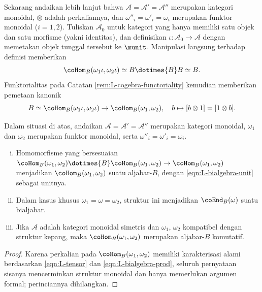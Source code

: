 Sekarang andaikan lebih lanjut bahwa $\mathcal{A} = \mathcal{A}' = \mathcal{A}''$ merupakan kategori monoidal, $\otimes$ adalah perkaliannya, dan $\omega''_i = \omega'_i = \omega_i$ merupakan funktor monoidal ($i=1,2$). Tuliskan $\mathcal{A}_0$ untuk kategori yang hanya memiliki satu objek dan satu morfisme (yakni identitas), dan definisikan $\iota: \mathcal{A}_0 \to \mathcal{A}$ dengan memetakan objek tunggal tersebut ke $\munit$. Manipulasi langsung terhadap definisi memberikan
\[ \coHom_B(\omega_1 \iota, \omega_2 \iota) \simeq B \dotimes{B} B \simeq B. \]
Funktorialitas pada Catatan \ref{rem:L-cogebra-functoriality} kemudian memberikan pemetaan kanonik
\begin{equation}\label{eqn:L-bialgebra-unit}
	B \simeq \coHom_B(\omega_1 \iota, \omega_2 \iota) \to \coHom_B(\omega_1, \omega_2), \quad b \mapsto [b \otimes 1] = [1 \otimes b].
\end{equation}

\begin{proposition}\label{prop:L-bialgebra}
	Dalam situasi di atas, andaikan $\mathcal{A} = \mathcal{A}' = \mathcal{A}''$ merupakan kategori monoidal, $\omega_1$ dan $\omega_2$ merupakan funktor monoidal, serta $\omega''_i = \omega'_i = \omega_i$.
	\begin{enumerate}[(i)]
		\item Homomorfisme yang bersesuaian $\coHom_B(\omega_1, \omega_2) \dotimes{B} \coHom_B(\omega_1, \omega_2) \to \coHom_B(\omega_1, \omega_2)$ menjadikan $\coHom_B(\omega_1, \omega_2)$ suatu aljabar-$B$, dengan \eqref{eqn:L-bialgebra-unit} sebagai unitnya.
		\item Dalam kasus khusus $\omega_1 = \omega = \omega_2$, struktur ini menjadikan $\coEnd_B(\omega)$ suatu bialjabar.
		\item Jika $\mathcal{A}$ adalah kategori monoidal simetris dan $\omega_1$, $\omega_2$ kompatibel dengan struktur kepang, maka $\coHom_B(\omega_1, \omega_2)$ merupakan aljabar-$B$ komutatif.
	\end{enumerate}
\end{proposition}
\begin{proof}
	Karena perkalian pada $\coHom_B(\omega_1, \omega_2)$ memiliki karakterisasi alami berdasarkan \eqref{eqn:L-tensor} dan \eqref{eqn:L-bialgebra-prod}, seluruh pernyataan sisanya mencerminkan struktur monoidal dan hanya memerlukan argumen formal; perinciannya dihilangkan.
\end{proof}
